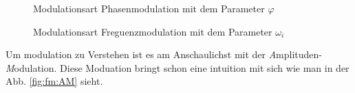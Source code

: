 \begin{figure}
    \centering
	
	\caption{Modulationsart Phasenmodulation mit dem Parameter \(\varphi\)}
	\label{fig:fm:PM}
\end{figure}

\begin{figure}
    \centering
	
	\caption{Modulationsart Freguenzmodulation mit dem Parameter \(\omega_i\)}
	\label{fig:fm:FM}
\end{figure}


Um modulation zu Verstehen ist es am Anschaulichst mit der  \textit{A}mplituden-\textit{M}odulation.
Diese Moduation bringt schon eine intuition mit sich wie man in der Abb. \ref{fig:fm:AM} sieht.

%        
%    
%        
%    
%        


